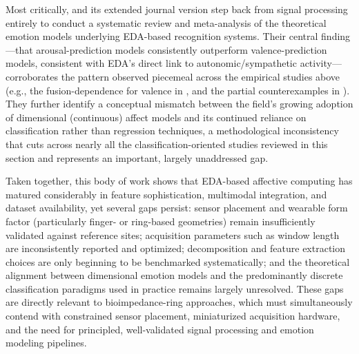 Most critically, \cite{damelio2023exploring} and its extended journal version \cite{damelio2025emotion} step back from signal processing entirely to conduct a systematic review and meta-analysis of the theoretical emotion models underlying EDA-based recognition systems. Their central finding---that arousal-prediction models consistently outperform valence-prediction models, consistent with EDA's direct link to autonomic/sympathetic activity---corroborates the pattern observed piecemeal across the empirical studies above (e.g., the fusion-dependence for valence in \cite{ayata2020emotion}, and the partial counterexamples in \cite{diaz2024fractal,polo2025advancing}). They further identify a conceptual mismatch between the field's growing adoption of dimensional (continuous) affect models and its continued reliance on classification rather than regression techniques, a methodological inconsistency that cuts across nearly all the classification-oriented studies reviewed in this section and represents an important, largely unaddressed gap.

Taken together, this body of work shows that EDA-based affective computing has matured considerably in feature sophistication, multimodal integration, and dataset availability, yet several gaps persist: sensor placement and wearable form factor (particularly finger- or ring-based geometries) remain insufficiently validated against reference sites; acquisition parameters such as window length are inconsistently reported and optimized; decomposition and feature extraction choices are only beginning to be benchmarked systematically; and the theoretical alignment between dimensional emotion models and the predominantly discrete classification paradigms used in practice remains largely unresolved. These gaps are directly relevant to bioimpedance-ring approaches, which must simultaneously contend with constrained sensor placement, miniaturized acquisition hardware, and the need for principled, well-validated signal processing and emotion modeling pipelines.

